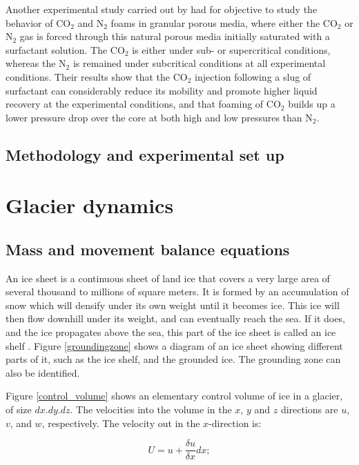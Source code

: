 \documentclass{article}
\begin{document}
Another experimental study carried out by \cite{farajzadeh2009comparative} had for objective to study the behavior of CO$_2$ and N$_2$ foams in granular porous media, where either the CO$_2$ or N$_2$ gas is forced through this natural porous media initially saturated with a surfactant solution. The CO$_2$ is either under sub- or supercritical conditions, whereas the N$_2$ is remained under subcritical conditions at all experimental conditions. Their results show that the CO$_2$ injection following a slug of surfactant can considerably reduce its mobility and promote higher liquid recovery at the experimental conditions, and that foaming of CO$_2$ builds up a lower pressure drop over the core at both high and low pressures than N$_2$.

\subsection{Methodology and experimental set up}


\section{Glacier dynamics}
\label{glacier_dynamics}
\subsection{Mass and movement balance equations}
An ice sheet is a continuous sheet of land ice that covers a very large area of several thousand to millions of square meters. It is formed by an accumulation of snow which will densify under its own weight until it becomes ice. This ice will then flow downhill under its weight, and can eventually reach the sea. If it does, and the ice propagates above the sea, this part of the ice sheet is called an ice shelf \cite[]{hutter1982mathematical}. Figure \ref{groundingzone} shows a diagram of an ice sheet showing different parts of it, such as the ice shelf, and the grounded ice. The grounding zone can also be identified. 

Figure \ref{control_volume} shows an elementary control volume of ice in a glacier, of size $dx.dy.dz$. The velocities into the volume in the $x$, $y$ and $z$ directions are $u$, $v$, and $w$, respectively. The velocity out in the $x$-direction is:

\begin{equation}
	U = u+\frac{\delta u}{\delta x}dx;
\end{equation}
\end{document}
